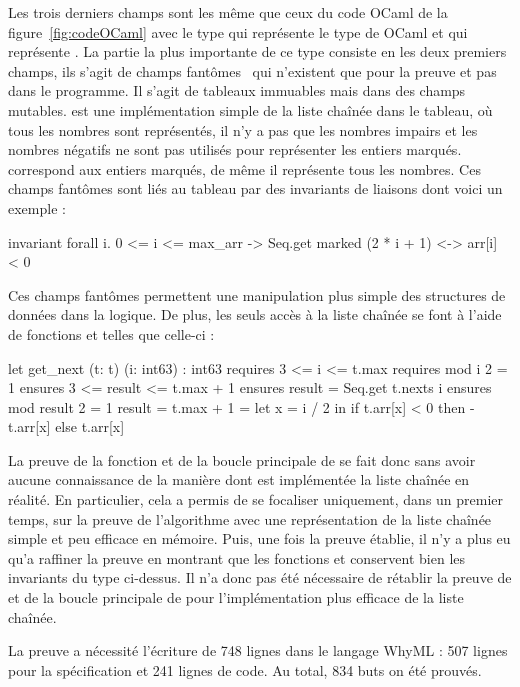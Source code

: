 \documentclass[a4paper]{easychair}
\begin{document}
Les trois derniers champs sont les même que ceux du code OCaml de la
figure~\ref{fig:codeOCaml} avec le type  qui représente le type
 de OCaml et  qui représente .
La partie la plus importante de ce type consiste en les deux premiers champs,
ils s'agit de champs fantômes~\cite{ghost-code} qui n'existent que pour la preuve
et pas dans le programme.
Il s'agit de tableaux immuables mais dans des champs mutables.
 est une implémentation simple de la liste chaînée dans le tableau,
où tous les nombres sont représentés, il n'y a pas que les nombres impairs et
les nombres négatifs ne sont pas utilisés pour représenter les entiers marqués.
 correspond aux entiers marqués, de même il représente tous les
nombres.
Ces champs fantômes sont liés au tableau  par des invariants de
liaisons dont voici un exemple :
\begin{why3}
invariant { forall i. 0 <= i <= max_arr ->
                 Seq.get marked (2 * i + 1) <-> arr[i] < 0 }
\end{why3}
Ces champs fantômes permettent une manipulation plus simple des
structures de données dans la logique. De plus, les seuls accès à la liste
chaînée se font à l'aide de fonctions  et  telles que
celle-ci :
\begin{why3}
let get_next (t: t) (i: int63) : int63
  requires { 3 <= i <= t.max }
  requires { mod i 2 = 1 }
  ensures  { 3 <= result <= t.max + 1 }
  ensures  { result = Seq.get t.nexts i }
  ensures  { mod result 2 = 1 \/ result = t.max + 1 }
= let x = i / 2 in
  if t.arr[x] < 0 then - t.arr[x] else t.arr[x]
\end{why3}

La preuve de la fonction  et de la boucle
principale de  se fait donc sans avoir aucune connaissance
de la manière dont est implémentée la liste chaînée en réalité.
En particulier, cela a permis de se focaliser uniquement, dans un premier temps,
sur la preuve de l'algorithme avec une représentation de la liste chaînée
simple et peu efficace en mémoire.
Puis, une fois la preuve établie, il n'y a plus eu qu'a raffiner la preuve en
montrant que les fonctions  et  conservent bien les
invariants du type ci-dessus.
Il n'a donc pas été nécessaire de rétablir la preuve de  et
de la boucle principale de  pour l'implémentation
plus efficace de la liste chaînée.


La preuve a nécessité l'écriture de 748 lignes dans le langage WhyML :
507 lignes pour la spécification et 241 lignes de code.
Au total, 834 buts on été prouvés.
\end{document}
